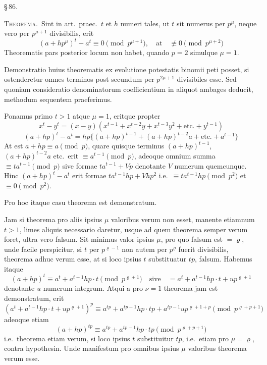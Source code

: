 \documentclass[12pt,a4paper]{article}
\theoremstyle{plain}
\theoremstyle{definition}
\theoremstyle{remark}
\begin{document}
\begin{center}\S\,86.\end{center}

\textsc{Theorema.}\ Sint in art.\ praec.\ $t$ et $h$ numeri tales, ut $t$ sit numerus per $p^\mu$, neque vero per $p^{\mu+1}$ divisibilis, erit
\[
(a + hp^\mu)^t - a^t \equiv 0 \pmod{p^{\mu+1}},\quad \text{at}\quad \not\equiv 0 \pmod{p^{\mu+2}}
\]
Theorematis pars posterior locum non habet, quando $p = 2$ simulque $\mu = 1$.

Demonstratio huius theorematis ex evolutione potestatis binomii peti posset, si ostenderetur omnes terminos post secundum per $p^{2\mu+1}$ divisibiles esse. Sed quoniam consideratio denominatorum coefficientium in aliquot ambages deducit, methodum sequentem praeferimus.

Ponamus primo $t > 1$ atque $\mu = 1$, eritque propter
\[
x^t - y^t = (x-y)(x^{t-1} + x^{t-2}y + x^{t-3}y^2 + \text{etc.} + y^{t-1})
\]
\[
(a + hp)^t - a^t = hp\{(a + hp)^{t-1} + (a + hp)^{t-2}a + \text{etc.} + a^{t-1}\}
\]
At est $a + hp \equiv a \pmod{p}$, quare quisque terminus $(a + hp)^{t-1}$, $(a + hp)^{t-2}a$ etc.\ erit $\equiv a^{t-1} \pmod{p}$, adeoque omnium summa $\equiv ta^{t-1} \pmod{p}$ sive formae $ta^{t-1} + Vp$ denotante $V$ numerum quemcunque. Hinc $(a + hp)^t - a^t$ erit formae $ta^{t-1}hp + Vhp^2$ i.e.\ $\equiv ta^{t-1}hp \pmod{p^2}$ et $\equiv 0 \pmod{p^2}$.

Pro hoc itaque casu theorema est demonstratum.

Jam si theorema pro aliis ipsius $\mu$ valoribus verum non esset, manente etiamnum $t > 1$, limes aliquis necessario daretur, usque ad quem theorema semper verum foret, ultra vero falsum. Sit minimus valor ipsius $\mu$, pro quo falsum est $= \varrho$, unde facile perspicitur, si $t$ per $p^{\varrho-1}$ non autem per $p^\varrho$ fuerit divisibilis, theorema adhuc verum esse, at si loco ipsius $t$ substituatur $tp$, falsum. Habemus itaque
\[
(a + hp)^t \equiv a^t + a^{t-1}hp \cdot t \pmod{p^{\varrho+1}}\quad \text{sive}\quad = a^t + a^{t-1}hp \cdot t + up^{\varrho+1}
\]
denotante $u$ numerum integrum. Atqui a pro $\nu = 1$ theorema jam est demonstratum, erit
\[
(a^t + a^{t-1}hp \cdot t + up^{\varrho+1})^p \equiv a^{tp} + a^{tp-1}hp \cdot tp + a^{tp-1}up^{\varrho+1+p} \pmod{p^{\varrho+p+1}}
\]
adeoque etiam
\[
(a + hp)^{tp} \equiv a^{tp} + a^{tp-1}hp \cdot tp \pmod{p^{\varrho+p+1}}
\]
i.e.\ theorema etiam verum, si loco ipsius $t$ substituitur $tp$, i.e.\ etiam pro $\mu = \varrho$, contra hypothesin. Unde manifestum pro omnibus ipsius $\mu$ valoribus theorema verum esse.
\end{document}
